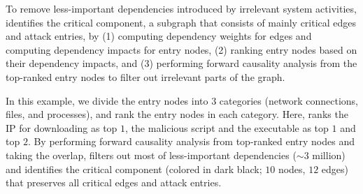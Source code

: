 To remove less-important dependencies introduced by irrelevant system activities, \tool identifies the critical component, a subgraph that consists of mainly 
critical edges and attack entries,
by (1) computing dependency weights for edges and computing dependency impacts for entry nodes, (2) ranking entry nodes based on their dependency impacts, and (3) performing forward causality analysis from the top-ranked entry nodes to filter out irrelevant parts of the graph.

In this example, we divide the entry nodes into $3$ categories (\ie network connections, files, and processes), and rank the entry nodes in each category.
Here, \tool ranks the IP  for  downloading as top $1$, the malicious script  and the executable 
as top $1$ and top $2$.
By performing forward causality analysis from top-ranked entry nodes and taking the overlap, \tool filters out most of less-important dependencies ($\sim 3$ million) and identifies the critical component (colored in dark black; $10$ nodes, $12$ edges) that preserves all critical edges and attack entries.
